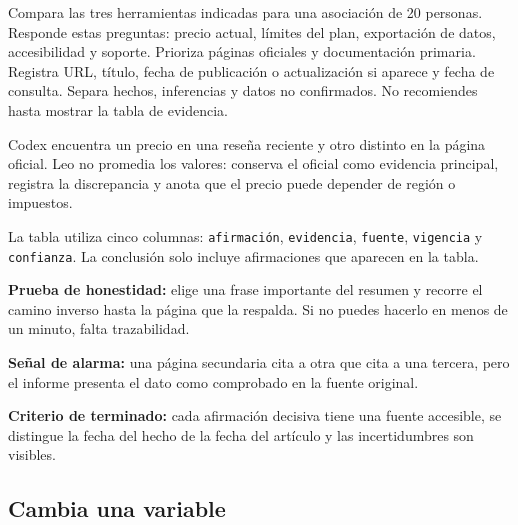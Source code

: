 \documentclass[10pt,a4paper,openany]{book}
\newenvironment{Shaded}{}{}
\newcommand{\NormalTok}[1]{#1}
\renewenvironment{Shaded}
  {\begin{tcolorbox}[
    enhanced,
    breakable,
    colback=CodeBg,
    colframe=Border,
    boxrule=0.5pt,
    arc=2mm,
    left=3mm,
    right=3mm,
    top=2.2mm,
    bottom=2.2mm,
    before skip=0.8em,
    after skip=0.9em
  ]}
  {\end{tcolorbox}}
\begin{document}
\begin{Shaded}
\begin{Highlighting}[]
\NormalTok{Compara las tres herramientas indicadas para una asociación de 20 personas.}
\NormalTok{Responde estas preguntas: precio actual, límites del plan, exportación de datos,}
\NormalTok{accesibilidad y soporte. Prioriza páginas oficiales y documentación primaria.}
\NormalTok{Registra URL, título, fecha de publicación o actualización si aparece y fecha}
\NormalTok{de consulta. Separa hechos, inferencias y datos no confirmados. No recomiendes}
\NormalTok{hasta mostrar la tabla de evidencia.}
\end{Highlighting}
\end{Shaded}

Codex encuentra un precio en una reseña reciente y otro distinto en la
página oficial. Leo no promedia los valores: conserva el oficial como
evidencia principal, registra la discrepancia y anota que el precio
puede depender de región o impuestos.

La tabla utiliza cinco columnas: \texttt{afirmación},
\texttt{evidencia}, \texttt{fuente}, \texttt{vigencia} y
\texttt{confianza}. La conclusión solo incluye afirmaciones que aparecen
en la tabla.

\begin{tipbox}

\textbf{Prueba de honestidad:} elige una frase importante del resumen y
recorre el camino inverso hasta la página que la respalda. Si no puedes
hacerlo en menos de un minuto, falta trazabilidad.

\end{tipbox}

\begin{warningbox}

\textbf{Señal de alarma:} una página secundaria cita a otra que cita a
una tercera, pero el informe presenta el dato como comprobado en la
fuente original.

\end{warningbox}

\begin{successbox}

\textbf{Criterio de terminado:} cada afirmación decisiva tiene una
fuente accesible, se distingue la fecha del hecho de la fecha del
artículo y las incertidumbres son visibles.

\end{successbox}

\subsection{Cambia una variable}\label{cambia-una-variable-8}
\end{document}
